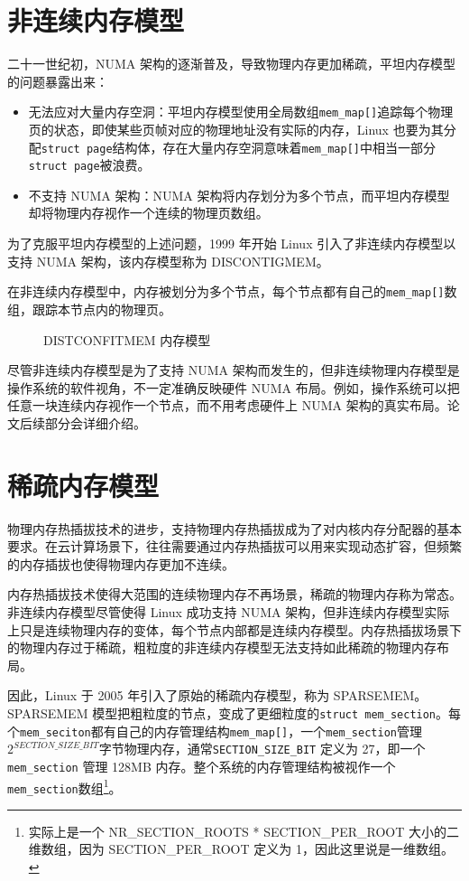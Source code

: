 \documentclass[AutoFakeBold]{LZUThesis}
\begin{document}
\begin{sloppypar}
\section{非连续内存模型}

二十一世纪初，NUMA
架构的逐渐普及，导致物理内存更加稀疏，平坦内存模型的问题暴露出来：

\begin{itemize}
\item
  无法应对大量内存空洞：平坦内存模型使用全局数组\texttt{mem\_map{[}{]}}追踪每个物理页的状态，即使某些页帧对应的物理地址没有实际的内存，Linux
  也要为其分配\texttt{struct\ page}结构体，存在大量内存空洞意味着\texttt{mem\_map{[}{]}}中相当一部分\texttt{struct\ page}被浪费。
\item
  不支持 NUMA 架构：NUMA
  架构将内存划分为多个节点，而平坦内存模型却将物理内存视作一个连续的物理页数组。
\end{itemize}

为了克服平坦内存模型的上述问题，1999 年开始 Linux
引入了非连续内存模型以支持 NUMA 架构，该内存模型称为 DISCONTIGMEM。

在非连续内存模型中，内存被划分为多个节点，每个节点都有自己的\texttt{mem\_map{[}{]}}数组，跟踪本节点内的物理页。

\begin{figure}
\centering

\caption{DISTCONFITMEM 内存模型}
\end{figure}

尽管非连续内存模型是为了支持 NUMA
架构而发生的，但非连续物理内存模型是操作系统的软件视角，不一定准确反映硬件
NUMA
布局。例如，操作系统可以把任意一块连续内存视作一个节点，而不用考虑硬件上
NUMA 架构的真实布局。论文后续部分会详细介绍。


\section{稀疏内存模型}

物理内存热插拔技术的进步，支持物理内存热插拔成为了对内核内存分配器的基本要求。在云计算场景下，往往需要通过内存热插拔可以用来实现动态扩容，但频繁的内存插拔也使得物理内存更加不连续。

内存热插拔技术使得大范围的连续物理内存不再场景，稀疏的物理内存称为常态。非连续内存模型尽管使得
Linux 成功支持 NUMA
架构，但非连续内存模型实际上只是连续物理内存的变体，每个节点内部都是连续内存模型。内存热插拔场景下的物理内存过于稀疏，粗粒度的非连续内存模型无法支持如此稀疏的物理内存布局。

因此，Linux 于 2005 年引入了原始的稀疏内存模型，称为
SPARSEMEM。SPARSEMEM
模型把粗粒度的节点，变成了更细粒度的\texttt{struct\ mem\_section}。每个\texttt{mem\_seciton}都有自己的内存管理结构\texttt{mem\_map{[}{]}}，一个\texttt{mem\_section}管理\(2^{SECTION\_SIZE\_BIT}\)字节物理内存，通常\texttt{SECTION\_SIZE\_BIT}
定义为 27，即一个\texttt{mem\_section} 管理 128MB
内存。整个系统的内存管理结构被视作一个\texttt{mem\_section}数组\footnote{实际上是一个
  NR\_SECTION\_ROOTS * SECTION\_PER\_ROOT 大小的二维数组，因为
  SECTION\_PER\_ROOT 定义为 1，因此这里说是一维数组。}。


\end{sloppypar}
\end{document}
